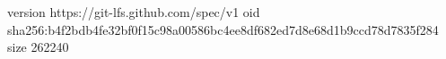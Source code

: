 version https://git-lfs.github.com/spec/v1
oid sha256:b4f2bdb4fe32bf0f15c98a00586bc4ee8df682ed7d8e68d1b9ccd78d7835f284
size 262240
